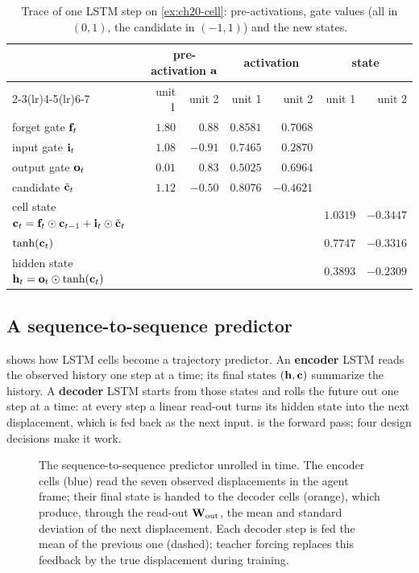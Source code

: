 \begin{table}[tb]
  \centering\small
  \caption{Trace of one LSTM step on \cref{ex:ch20-cell}: pre-activations,
  gate values (all in $(0,1)$, the candidate in $(-1,1)$) and the new states.}
  \label{tab:ch20-cell}
  \begin{tabular}{@{}lrrrrrr@{}}
  \toprule
  & \multicolumn{2}{c}{pre-activation $\mathbf{a}$} & \multicolumn{2}{c}{activation} & \multicolumn{2}{c}{state}\\
  \cmidrule(lr){2-3}\cmidrule(lr){4-5}\cmidrule(lr){6-7}
  & unit 1 & unit 2 & unit 1 & unit 2 & unit 1 & unit 2\\
  \midrule
  forget gate $\mathbf{f}_t$      & $1.80$ & $0.88$ & $0.8581$ & $0.7068$ & &\\
  input gate $\mathbf{i}_t$       & $1.08$ & $-0.91$ & $0.7465$ & $0.2870$ & &\\
  output gate $\mathbf{o}_t$      & $0.01$ & $0.83$ & $0.5025$ & $0.6964$ & &\\
  candidate $\tilde{\mathbf{c}}_t$ & $1.12$ & $-0.50$ & $0.8076$ & $-0.4621$ & &\\
  cell state $\mathbf{c}_t = \mathbf{f}_t \odot \mathbf{c}_{t-1} + \mathbf{i}_t \odot \tilde{\mathbf{c}}_t$ & & & & & $1.0319$ & $-0.3447$\\
  $\tanh(\mathbf{c}_t)$            & & & & & $0.7747$ & $-0.3316$\\
  hidden state $\mathbf{h}_t = \mathbf{o}_t \odot \tanh(\mathbf{c}_t)$ & & & & & $0.3893$ & $-0.2309$\\
  \bottomrule
  \end{tabular}
\end{table}

\subsection{A sequence-to-sequence predictor}
\label{sec:ch20-seq2seq}

 shows how LSTM cells become a trajectory predictor.
An \textbf{encoder} LSTM reads the observed
history one step at a time; its final states $(\mathbf{h}, \mathbf{c})$ summarize
the history. A \textbf{decoder} LSTM starts from those states and rolls the
future out one step at a time: at every step a linear read-out turns its
hidden state into the next displacement, which is fed back as the next
input.  is the forward pass; four design decisions
make it work.

\begin{figure}[tb]
  \centering
  \caption{The sequence-to-sequence predictor unrolled in time. The encoder
  cells (blue) read the seven observed displacements in the agent frame;
  their final state is handed to the decoder cells (orange), which produce,
  through the read-out $\mathbf{W}_{\mathrm{out}}$, the mean and standard deviation
  of the next displacement. Each decoder step is fed the mean of the previous
  one (dashed); teacher forcing replaces this feedback by the true
  displacement during training.}
  \label{fig:ch20-seq2seq}
\end{figure}

